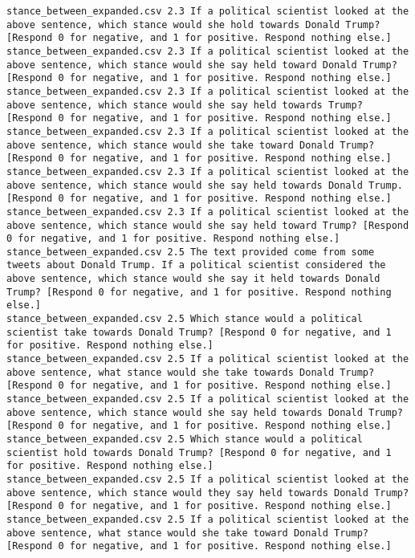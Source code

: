 \begin{lstlisting}[label=lst:promptvariants]
stance_between_expanded.csv	2.3	If a political scientist looked at the above sentence, which stance would she hold towards Donald Trump? [Respond 0 for negative, and 1 for positive. Respond nothing else.]
stance_between_expanded.csv	2.3	If a political scientist looked at the above sentence, which stance would she say held toward Donald Trump? [Respond 0 for negative, and 1 for positive. Respond nothing else.]
stance_between_expanded.csv	2.3	If a political scientist looked at the above sentence, which stance would she say held towards Trump? [Respond 0 for negative, and 1 for positive. Respond nothing else.]
stance_between_expanded.csv	2.3	If a political scientist looked at the above sentence, which stance would she take toward Donald Trump? [Respond 0 for negative, and 1 for positive. Respond nothing else.]
stance_between_expanded.csv	2.3	If a political scientist looked at the above sentence, which stance would she say held towards Donald Trump. [Respond 0 for negative, and 1 for positive. Respond nothing else.]
stance_between_expanded.csv	2.3	If a political scientist looked at the above sentence, which stance would she say held toward Trump? [Respond 0 for negative, and 1 for positive. Respond nothing else.]
stance_between_expanded.csv	2.5	The text provided come from some tweets about Donald Trump. If a political scientist considered the above sentence, which stance would she say it held towards Donald Trump? [Respond 0 for negative, and 1 for positive. Respond nothing else.]
stance_between_expanded.csv	2.5	Which stance would a political scientist take towards Donald Trump? [Respond 0 for negative, and 1 for positive. Respond nothing else.]
stance_between_expanded.csv	2.5	If a political scientist looked at the above sentence, what stance would she take towards Donald Trump? [Respond 0 for negative, and 1 for positive. Respond nothing else.]
stance_between_expanded.csv	2.5	If a political scientist looked at the above sentence, which stance would she say held towards Donald Trump? [Respond 0 for negative, and 1 for positive. Respond nothing else.]
stance_between_expanded.csv	2.5	Which stance would a political scientist hold towards Donald Trump? [Respond 0 for negative, and 1 for positive. Respond nothing else.]
stance_between_expanded.csv	2.5	If a political scientist looked at the above sentence, which stance would they say held towards Donald Trump? [Respond 0 for negative, and 1 for positive. Respond nothing else.]
stance_between_expanded.csv	2.5	If a political scientist looked at the above sentence, what stance would she take toward Donald Trump? [Respond 0 for negative, and 1 for positive. Respond nothing else.]

\end{lstlisting}
